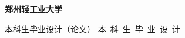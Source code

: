 \thispagestyle{empty}
\setcounter{page}{-1}

\begin{flushright}
\end{flushright}


\begin{center}
    { \songti{}\bfseries 郑州轻工业大学 }
\end{center}

\begin{center}
     \setlength{\parskip}{-1em}\huawenxinwei
    {
        本科生毕业设计（论文）
    }
    {
        本~科~生~毕~业~设~计
    }
\end{center}

\vskip 20pt



\vskip 5cm

{
    \newcommand{\CoverTitle}{
        \makebox[4em][s]{题目}      &  \uline{\hfill \heiti\Title{} \hfill} \\
        ~ & ~\\
    }
}
{
    \newcommand{\CoverTitle}{
        \makebox[4em][s]{题目}      &  \uline{\hfill \heiti\TitleLineOne{} \hfill} \\
        ~        & \uline{\hfill \heiti\TitleLineTwo{} \hfill} \\
    }
}

